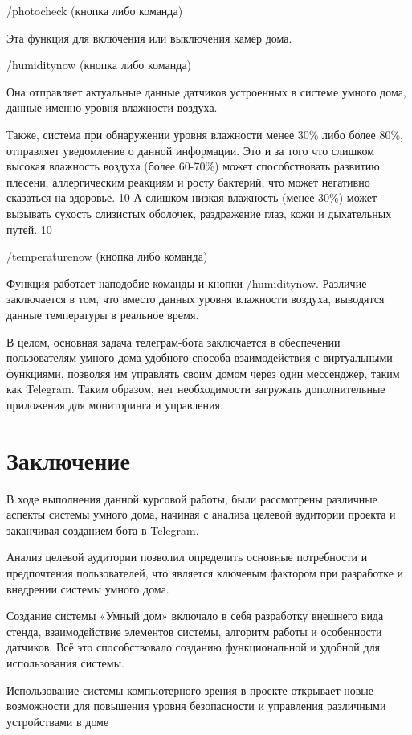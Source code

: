 /photocheck (кнопка либо команда)

Эта функция для включения или выключения камер дома.

/humiditynow (кнопка либо команда)

Она отправляет актуальные данные датчиков устроенных в системе умного дома, данные именно уровня влажности воздуха.

Также, система при обнаружении уровня влажности менее 30\% либо более 80\%, отправляет уведомление о данной информации. Это и за того что слишком высокая влажность воздуха (более 60-70\%) может способствовать развитию плесени, аллергическим реакциям и росту бактерий, что может негативно сказаться на здоровье. 10 А слишком низкая влажность (менее 30\%) может вызывать сухость слизистых оболочек, раздражение глаз, кожи и дыхательных путей. 10

/temperaturenow (кнопка либо команда)

Функция работает наподобие команды и кнопки /humiditynow. Различие заключается в том, что вместо данных уровня влажности воздуха, выводятся данные температуры в реальное время. 

В целом, основная задача телеграм-бота заключается в обеспечении пользователям умного дома удобного способа взаимодействия с виртуальными функциями, позволяя им управлять своим домом через один мессенджер, таким как Telegram. Таким образом, нет необходимости загружать дополнительные приложения для мониторинга и управления.

\chapter{Заключение}

В ходе выполнения данной курсовой работы,  были рассмотрены различные аспекты системы умного дома, начиная с анализа целевой аудитории проекта и заканчивая созданием бота в Telegram.

Анализ целевой аудитории позволил определить основные потребности и предпочтения пользователей, что является ключевым фактором при разработке и внедрении системы умного дома.

Создание системы «Умный дом» включало в себя разработку внешнего вида стенда, взаимодействие элементов системы, алгоритм работы и особенности датчиков. Всё это способствовало созданию функциональной и удобной для использования системы.

Использование системы компьютерного зрения в проекте открывает новые возможности для повышения уровня безопасности и управления различными устройствами в доме


